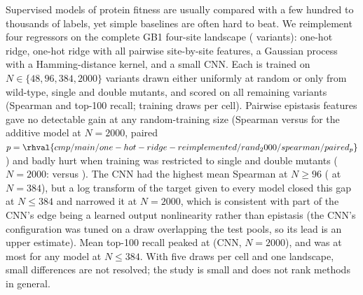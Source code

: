 Supervised models of protein fitness are usually compared with a few hundred to thousands of labels, yet simple baselines are often hard to beat.
We reimplement four regressors on the complete GB1 four-site landscape ( variants): one-hot ridge, one-hot ridge with all pairwise site-by-site features, a Gaussian process with a Hamming-distance kernel, and a small CNN.
Each is trained on $N\in\{48,96,384,2000\}$ variants drawn either uniformly at random or only from wild-type, single and double mutants, and scored on all remaining variants (Spearman and top-100 recall;  training draws per cell).
Pairwise epistasis features gave no detectable gain at any random-training size (Spearman  versus  for the additive model at $N{=}2000$, paired $p=\rhval{cmp/main/one-hot-ridge-reimplemented/rand_2000/spearman/paired_p}$) and badly hurt when training was restricted to single and double mutants ($N{=}2000$:  versus ).
The CNN had the highest mean Spearman at $N\ge 96$ ( at $N{=}384$), but a log transform of the target given to every model closed this gap at $N\le384$ and narrowed it at $N{=}2000$, which is consistent with part of the CNN's edge being a learned output nonlinearity rather than epistasis (the CNN's configuration was tuned on a draw overlapping the test pools, so its lead is an upper estimate).
Mean top-100 recall peaked at  (CNN, $N{=}2000$), and was at most  for any model at $N\le 384$.
With five draws per cell and one landscape, small differences are not resolved; the study is small and does not rank methods in general.

